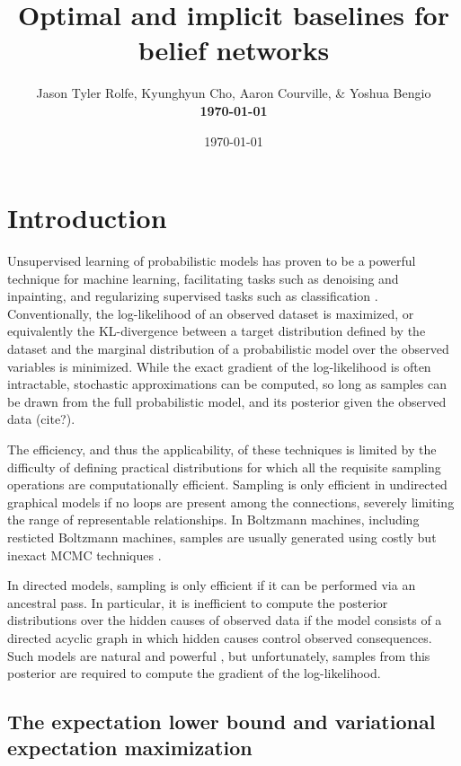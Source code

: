 \documentclass{article} %
\title{Optimal and implicit baselines for belief networks}
\author{Jason Tyler Rolfe, Kyunghyun Cho, Aaron Courville, \& Yoshua Bengio \\
{\bf \today}}
\date{\today}
\begin{document}
\maketitle

\section{Introduction}


Unsupervised learning of probabilistic models has proven to be a powerful technique for machine learning, facilitating tasks such as denoising and inpainting, and regularizing supervised tasks such as classification \cite{hinton2006fast, salakhutdinov2009deep}.  Conventionally, the log-likelihood of an observed dataset is maximized, or equivalently the KL-divergence between a target distribution defined by the dataset and the marginal distribution of a probabilistic model over the observed variables is minimized.  While the exact gradient of the log-likelihood is often intractable, stochastic approximations can be computed, so long as samples can be drawn from the full probabilistic model, and its posterior given the observed data (cite?).

The efficiency, and thus the applicability, of these techniques is limited by the difficulty of defining practical distributions for which all the requisite sampling operations are computationally efficient.  Sampling is only efficient in undirected graphical models if no loops are present among the connections, severely limiting the range of representable relationships.  In Boltzmann machines, including resticted Boltzmann machines, samples are usually generated using costly but inexact MCMC techniques \cite{hinton1983optimal}.  

In directed models, sampling is only efficient if it can be performed via an ancestral pass.  In particular, it is inefficient to compute the posterior distributions over the hidden causes of observed data if the model consists of a directed acyclic graph in which hidden causes control observed consequences.  %
Such models are natural and powerful \cite{hinton2006fast}, but unfortunately, samples from this posterior are required to compute the gradient of the log-likelihood.

\subsection{The expectation lower bound and variational expectation maximization}
\end{document}
